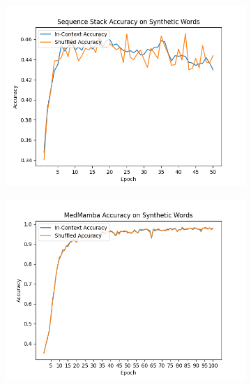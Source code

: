 \begin{figure}[!ht]
    \begin{subfigure}{0.5\textwidth}
        \includegraphics[width=\textwidth]{figures/sequence_stack_words.png}
        \caption{}
        \label{resultsc}
    \end{subfigure}\begin{subfigure}{0.5\textwidth}
        \includegraphics[width=\textwidth]{figures/medmamba_words.png}
        \caption{}
        \label{resultsd}
    \end{subfigure}
    \begin{subfigure}{0.5\textwidth}

\end{subfigure}
\end{figure}
